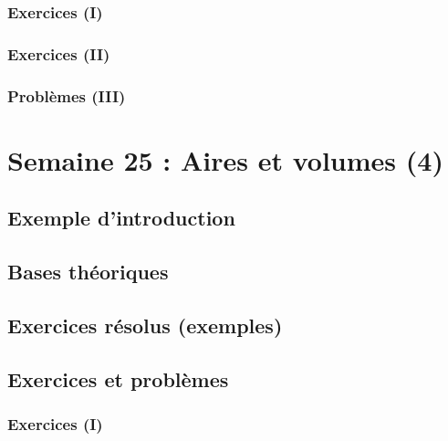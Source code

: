 \documentclass[
  12pt,
]{book}
\begin{document}
\hypertarget{exercices-i-23}{%
\subsection{Exercices (I)}\label{exercices-i-23}}

\hypertarget{exercices-ii-23}{%
\subsection{Exercices (II)}\label{exercices-ii-23}}

\hypertarget{probluxe8mes-iii-23}{%
\subsection{Problèmes (III)}\label{probluxe8mes-iii-23}}

\hypertarget{semaine-25-aires-et-volumes-4}{%
\chapter{Semaine 25 : Aires et volumes (4)}\label{semaine-25-aires-et-volumes-4}}

\hypertarget{exemple-dintroduction-24}{%
\section{Exemple d'introduction}\label{exemple-dintroduction-24}}

\hypertarget{bases-thuxe9oriques-24}{%
\section{Bases théoriques}\label{bases-thuxe9oriques-24}}

\hypertarget{exercices-ruxe9solus-exemples-24}{%
\section{Exercices résolus (exemples)}\label{exercices-ruxe9solus-exemples-24}}

\hypertarget{exercices-et-probluxe8mes-24}{%
\section{Exercices et problèmes}\label{exercices-et-probluxe8mes-24}}

\hypertarget{exercices-i-24}{%
\subsection{Exercices (I)}\label{exercices-i-24}}
\end{document}
